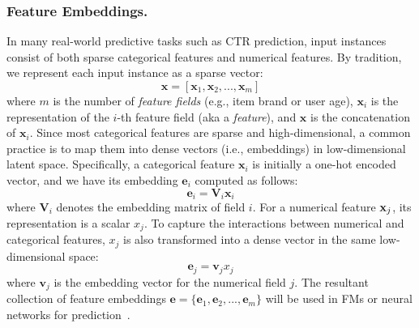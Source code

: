 \documentclass[letterpaper]{article} \usepackage{aaai20}  \usepackage{times}  \usepackage{helvet} \usepackage{courier}  \usepackage[hyphens]{url}  \usepackage{graphicx} \urlstyle{rm} \def\UrlFont{\rm}  \usepackage{graphicx}  \frenchspacing  \setlength{\pdfpagewidth}{8.5in}  \setlength{\pdfpageheight}{11in}
\begin{document}
\subsubsection{Feature Embeddings.}
In many real-world predictive tasks such as CTR prediction, input instances consist of both sparse categorical features and numerical features.
By tradition, we represent each input instance as a sparse vector:
\begin{equation}
\mathbf{x} = [\mathbf{x}_1,\mathbf{x}_2,...,\mathbf{x}_m]
\end{equation}
where $m$ is the number of \emph{feature fields} (e.g., item brand or user age), $\mathbf{x}_i$ is the representation of the $i$-th feature field (aka a \emph{feature}), and $\mathbf{x}$ is the concatenation of $\mathbf{x}_i$.
Since most categorical features are sparse and high-dimensional, a common practice is to map them into dense vectors (i.e., embeddings) in low-dimensional latent space. 
Specifically, a categorical feature $\mathbf{x}_i$ is initially a one-hot encoded vector, and we have its embedding $\mathbf{e}_i$ computed as follows:
\begin{equation}
	\mathbf{e}_i = \mathbf{V}_i\mathbf{x}_i
\end{equation}
where $\mathbf{V}_i$ denotes the embedding matrix of field $i$. For a numerical feature ${\bf x}_j$, its representation is a scalar $x_j$. To capture the interactions between numerical and categorical features, $x_j$ is also transformed into a dense vector in the same low-dimensional space:
\begin{equation} 
	\mathbf{e}_j = \mathbf{v}_jx_j
\end{equation}
where $\mathbf{v}_j$ is the embedding vector for the numerical field $j$. The resultant collection of feature embeddings $\mathbf{e}=\{\mathbf{e}_1,\mathbf{e}_2,...,\mathbf{e}_m\}$ will be used in FMs or neural networks for prediction~\cite{DBLP:conf/ijcai/ChengSZH18,DBLP:conf/icdm/LiSZ18}.
\end{document}
